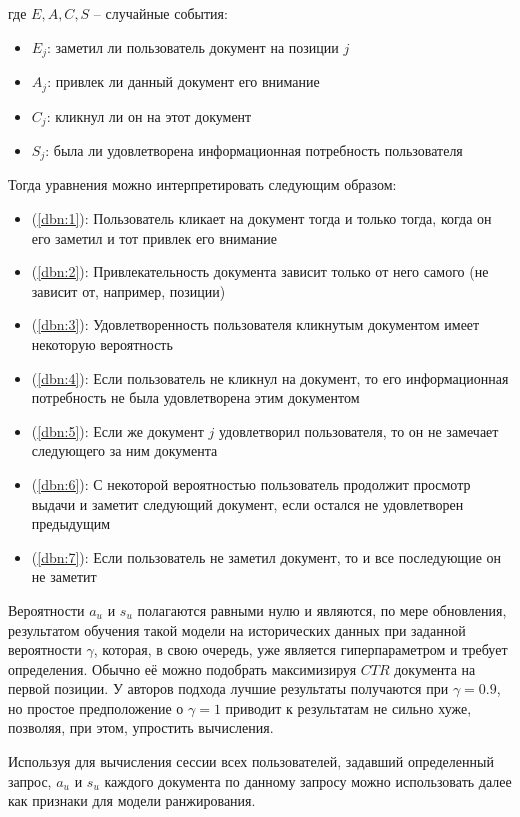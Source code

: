\documentclass[diploma]{nanolab2015}
\begin{document}
где $E, A, C, S$ -- случайные события:
\begin{itemize}
    \item $E_j$: заметил ли пользователь документ на позиции $j$
    \item $A_j$: привлек ли данный документ его внимание
    \item $C_j$: кликнул ли он на этот документ
    \item $S_j$: была ли удовлетворена информационная потребность пользователя
\end{itemize}
Тогда уравнения можно интерпретировать следующим образом:
\begin{itemize}
    \item (\ref{dbn:1}): Пользователь кликает на документ тогда и только тогда, когда он его заметил и тот привлек его внимание
    \item (\ref{dbn:2}): Привлекательность документа зависит только от него самого (не зависит от, например, позиции)
    \item (\ref{dbn:3}): Удовлетворенность пользователя кликнутым документом имеет некоторую вероятность
    \item (\ref{dbn:4}): Если пользователь не кликнул на документ, то его информационная потребность не была удовлетворена этим документом
    \item (\ref{dbn:5}): Если же документ $j$ удовлетворил пользователя, то он не замечает следующего за ним документа
    \item (\ref{dbn:6}): С некоторой вероятностью пользователь продолжит просмотр выдачи и заметит следующий документ, если остался не удовлетворен предыдущим
    \item (\ref{dbn:7}): Если пользователь не заметил документ, то и все последующие он не заметит
\end{itemize}

Вероятности $a_u$ и $s_u$ полагаются равными нулю и являются, по мере обновления, результатом обучения такой модели на исторических данных при заданной вероятности $\gamma$, которая, в свою очередь, уже является гиперпараметром и требует определения. Обычно её можно подобрать максимизируя $CTR$ документа на первой позиции. У авторов подхода лучшие результаты получаются при $\gamma = 0.9$, но простое предположение о $\gamma = 1$ приводит к результатам не сильно хуже, позволяя, при этом, упростить вычисления.

Используя для вычисления сессии всех пользователей, задавший определенный запрос, $a_u$ и $s_u$ каждого документа по данному запросу можно использовать далее как признаки для модели ранжирования.
\end{document}

